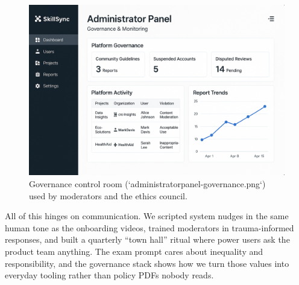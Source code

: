 \begin{figure}[h]
  \centering
  \includegraphics[width=0.85\linewidth]{figures/administratorpanel-governance.png}
  \caption{Governance control room (`administratorpanel-governance.png`) used by moderators and the ethics council.}
  \label{fig:admin-panel}
\end{figure}

All of this hinges on communication. We scripted system nudges in the same human tone as the onboarding videos, trained moderators in trauma-informed responses, and built a quarterly ``town hall'' ritual where power users ask the product team anything. The exam prompt cares about inequality and responsibility, and the governance stack shows how we turn those values into everyday tooling rather than policy PDFs nobody reads.
